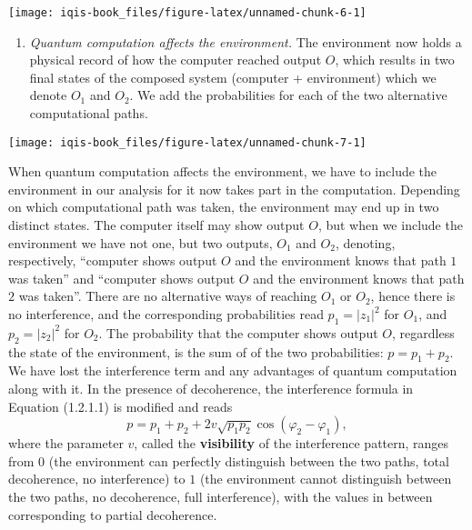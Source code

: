 \documentclass[fleqn]{article}
\providecommand{\tightlist}{%
  \setlength{\itemsep}{0pt}\setlength{\parskip}{0pt}}
\begin{document}
\begin{center}\texttt{[image: iqis-book\_files/figure-latex/unnamed-chunk-6-1]} \end{center}

\begin{enumerate}
\def\labelenumi{\arabic{enumi}.}
\setcounter{enumi}{1}
\tightlist
\item
  \emph{Quantum computation affects the environment.}
  The environment now holds a physical record of how the computer reached output \(O\), which results in two final states of the composed system (computer + environment) which we denote \(O_1\) and \(O_2\).
  We add the probabilities for each of the two alternative computational paths.
\end{enumerate}

\begin{center}\texttt{[image: iqis-book\_files/figure-latex/unnamed-chunk-7-1]} \end{center}

When quantum computation affects the environment, we have to include the environment in our analysis for it now takes part in the computation.
Depending on which computational path was taken, the environment may end up in two distinct states.
The computer itself may show output \(O\), but when we include the environment we have not one, but two outputs, \(O_1\) and \(O_2\), denoting, respectively, ``computer shows output \(O\) and the environment knows that path \(1\) was taken'' and ``computer shows output \(O\) and the environment knows that path \(2\) was taken''.
There are no alternative ways of reaching \(O_1\) or \(O_2\), hence there is no interference, and the corresponding probabilities read \(p_1=|z_1|^2\) for \(O_1\), and \(p_2=|z_2|^2\) for \(O_2\).
The probability that the computer shows output \(O\), regardless the state of the environment, is the sum of of the two probabilities: \(p=p_1+p_2\).
We have lost the interference term and any advantages of quantum computation along with it.
In the presence of decoherence, the interference formula in Equation (1.2.1.1) is modified and reads
\[
p
= p_1 + p_2 + 2 v \sqrt{p_1 p_2}\cos (\varphi_2-\varphi_1),
\]
where the parameter \(v\), called the \textbf{visibility} of the interference pattern, ranges from \(0\) (the environment can perfectly distinguish between the two paths, total decoherence, no interference) to \(1\) (the environment cannot distinguish between the two paths, no decoherence, full interference), with the values in between corresponding to partial decoherence.
\end{document}
